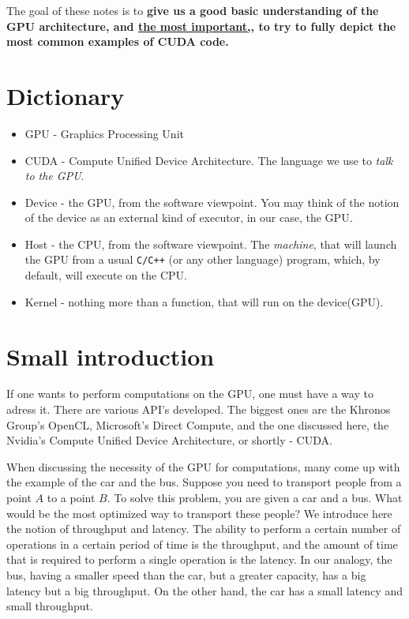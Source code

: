 \documentclass[12pt]{article}
\begin{document}
The goal of these notes is to \textbf{give us a good basic understanding of the 
GPU architecture, and \underline{the most important,}, to try to fully depict
the most common examples of CUDA code.} 

\section*{Dictionary}
\label{section:dictionary}
\begin{itemize}
   \setlength\itemsep{-0.5em}
   \item GPU - Graphics Processing Unit
   \item CUDA - Compute Unified Device Architecture. The language we use to \textit{talk to the GPU}. 
   \item Device - the GPU, from the software viewpoint. You may think of the notion of the 
   device as an external kind of executor, in our case, the GPU.
   \item Host - the CPU, from the software viewpoint. The \textit{machine}, that will launch the GPU from a
    usual \verb|C/C++| (or any other language) program, which, by default, will execute on the CPU.
   \item Kernel - nothing more than a function, that will run on the device(GPU).
\end{itemize}



\newpage

\section*{Small introduction}
If one wants to perform computations on the GPU, one must have a way to adress it. There are various
API's developed. The biggest ones are the Khronos Group's OpenCL, Microsoft's Direct Compute, and the one 
discussed here, the Nvidia's Compute Unified Device Architecture, or shortly - CUDA.


When discussing the necessity of the GPU for computations, many come up with the example of the car and the bus. 
Suppose you need to transport people from a point $A$ to a point $B$. To solve this problem, you are 
given a car and a bus. What would be the most optimized way to transport these people? We introduce here
the notion of throughput and latency. The ability to perform a certain number of operations in a certain period of 
time is the throughput, and the amount of time that is required to perform a single operation is the latency.
In our analogy, the bus, having a smaller speed than the car, but a greater capacity, has a big latency but 
a big throughput. On the other hand, the car has a small latency and small throughput.
\end{document}
